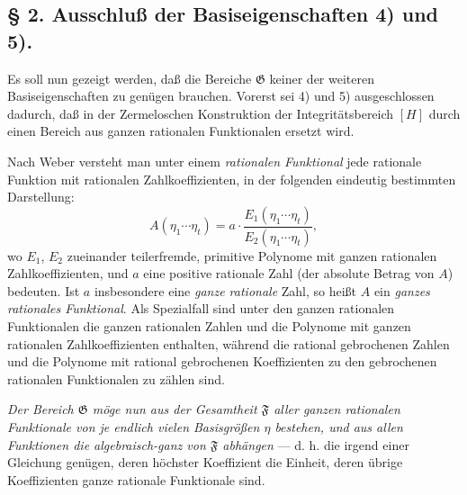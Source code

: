 \subsection*{§ 2. Ausschluß der Basiseigenschaften 4) und 5).}

Es soll nun gezeigt werden, daß die Bereiche $\mathfrak G$ keiner der weiteren
Basiseigenschaften zu genügen brauchen. Vorerst sei 4) und 5) ausgeschlossen
dadurch, daß in der Zermeloschen Konstruktion der Integritätsbereich $[H]$ durch
einen Bereich aus ganzen rationalen \glqq{}Funktionalen\grqq{} ersetzt wird.

Nach Weber versteht man unter einem \emph{rationalen Funktional} jede rationale
Funktion mit rationalen Zahlkoeffizienten, in der folgenden eindeutig bestimmten
Darstellung:
\[
 A(\eta_1\cdots \eta_t)
   = a\cdot\frac{E_1(\eta_1\cdots \eta_t)}{E_2(\eta_1\cdots \eta_t)},
\]
wo $E_1$, $E_2$ zueinander teilerfremde, primitive Polynome mit ganzen
rationalen Zahlkoeffizienten, und $a$ eine positive rationale Zahl (der absolute
Betrag von $A$) bedeuten. Ist $a$ insbesondere eine \emph{ganze rationale} Zahl,
so heißt $A$ ein \emph{ganzes rationales Funktional}. Als Spezialfall sind unter
den ganzen rationalen Funktionalen die ganzen rationalen Zahlen und die Polynome
mit ganzen rationalen Zahlkoeffizienten enthalten, während die rational
gebrochenen Zahlen und die Polynome mit rational gebrochenen Koeffizienten zu
den gebrochenen rationalen Funktionalen zu zählen sind.

\emph{Der Bereich $\mathfrak G$ möge nun aus der Gesamtheit $\mathfrak F$ aller
ganzen rationalen Funktionale von je endlich vielen Basisgrößen $\eta$ bestehen,
und aus allen Funktionen die algebraisch-ganz von $\mathfrak F$ abhängen} ---
d. h. die irgend einer Gleichung genügen, deren höchster Koeffizient die Einheit,
deren übrige Koeffizienten ganze rationale Funktionale sind.

